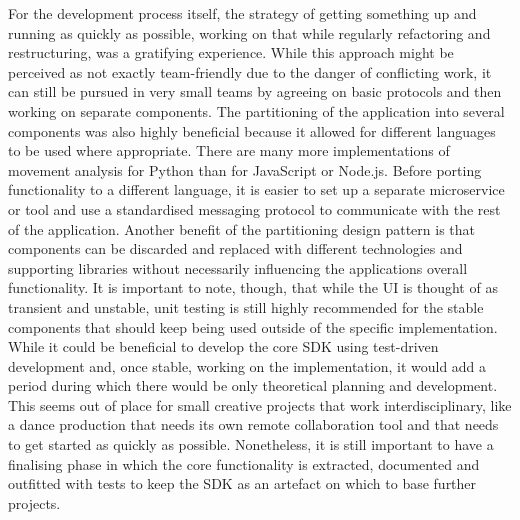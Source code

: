 For the development process itself, the strategy of getting something up and running as quickly as possible, working on that while regularly refactoring and restructuring, was a gratifying experience.
While this approach might be perceived as not exactly team-friendly due to the danger of conflicting work, it can still be pursued in very small teams by agreeing on basic protocols and then working on separate components.
The partitioning of the application into several components was also highly beneficial because it allowed for different languages to be used where appropriate.
There are many more implementations of movement analysis for Python than for JavaScript or Node.js. Before porting functionality to a different language, it is easier to set up a separate microservice or tool and use a standardised messaging protocol to communicate with the rest of the application.
Another benefit of the partitioning design pattern is that components can be discarded and replaced with different technologies and supporting libraries without necessarily influencing the application\textquotesingle s overall functionality.
It is important to note, though, that while the \ac{UI} is thought of as transient and unstable, unit testing is still highly recommended for the stable components that should keep being used outside of the specific implementation.
While it could be beneficial to develop the core \ac{SDK} using test-driven development and, once stable, working on the implementation, it would add a period during which there would be only theoretical planning and development.
This seems out of place for small creative projects that work interdisciplinary, like a dance production that needs its own remote collaboration tool and that needs to get started as quickly as possible.
Nonetheless, it is still important to have a finalising phase in which the core functionality is extracted, documented and outfitted with tests to keep the \ac{SDK} as an artefact on which to base further projects.
